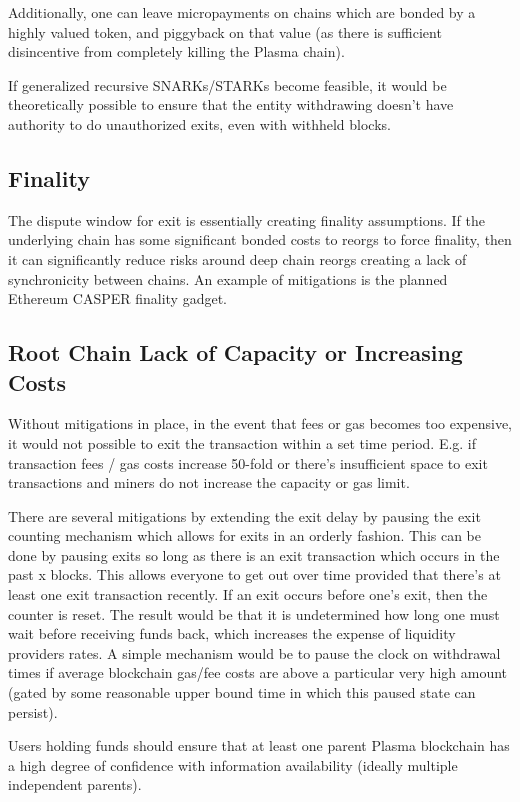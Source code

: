 \documentclass[letterpaper, 11pt]{article}
\begin{document}
Additionally, one can leave micropayments on chains which are bonded by a
highly valued token, and piggyback on that value (as there is sufficient
disincentive from completely killing the Plasma chain).

If generalized recursive SNARKs/STARKs become feasible, it would be
theoretically possible to ensure that the entity withdrawing doesn't have
authority to do unauthorized exits, even with withheld blocks.

\subsection{Finality}

The dispute window for exit is essentially creating finality assumptions. If the
underlying chain has some significant bonded costs to reorgs to force finality,
then it can significantly reduce risks around deep chain reorgs creating a lack
of synchronicity between chains. An example of mitigations is the planned
Ethereum CASPER finality gadget.

\subsection{Root Chain Lack of Capacity or Increasing Costs} 

Without mitigations in place, in the event that fees or gas becomes too
expensive, it would not possible to exit the transaction within a set time
period. E.g. if transaction fees / gas costs increase 50-fold or there's
insufficient space to exit transactions and miners do not increase the capacity
or gas limit.

There are several mitigations by extending the exit delay by pausing the exit
counting mechanism which allows for exits in an orderly fashion. This can be
done by pausing exits so long as there is an exit transaction which occurs in
the past x blocks. This allows everyone to get out over time provided that
there's at least one exit transaction recently. If an exit occurs before one's
exit, then the counter is reset. The result would be that it is undetermined how
long one must wait before receiving funds back, which increases the expense of
liquidity providers rates. A simple mechanism would be to pause the clock on
withdrawal times if average blockchain gas/fee costs are above a particular very
high amount (gated by some reasonable upper bound time in which this paused
state can persist).

Users holding funds should ensure that at least one parent Plasma blockchain has
a high degree of confidence with information availability (ideally multiple
independent parents).
\end{document}

